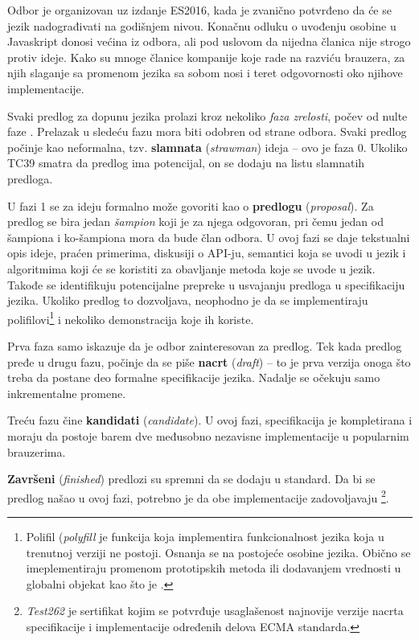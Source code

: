 Odbor je organizovan uz izdanje ES2016, kada je zvanično potvrđeno da će se jezik nadograđivati na godišnjem nivou.
Konačnu odluku o uvođenju osobine u Javaskript donosi većina iz odbora, ali pod uslovom da nijedna članica nije strogo protiv ideje.
Kako su mnoge članice kompanije koje rade na razviću brauzera, za njih slaganje sa promenom jezika sa sobom nosi i teret odgovornosti oko njihove implementacije.

Svaki predlog za dopunu jezika prolazi kroz nekoliko \textit{faza zrelosti}, počev od nulte faze \cite{axel-rauschmayer:tc39}.
Prelazak u sledeću fazu mora biti odobren od strane odbora.
Svaki predlog počinje kao neformalna, tzv. \textbf{slamnata} (\textsl{strawman}) ideja -- ovo je faza 0.
Ukoliko TC39 smatra da predlog ima potencijal, on se dodaju na listu slamnatih predloga.

U fazi 1 se za ideju formalno može govoriti kao o \textbf{predlogu} (\textsl{proposal}). 
Za predlog se bira jedan \textit{šampion} koji je za njega odgovoran, pri čemu jedan od šampiona i ko-šampiona mora da bude član odbora.
U ovoj fazi se daje tekstualni opis ideje, praćen primerima, diskusiji o API-ju, semantici koja se uvodi u jezik i algoritmima koji će se koristiti za obavljanje metoda koje se uvode u jezik.
Takođe se identifikuju potencijalne prepreke u usvajanju predloga u specifikaciju jezika.
Ukoliko predlog to dozvoljava, neophodno je da se implementiraju polifilovi\footnote{Polifil (\textsl{polyfill} je funkcija koja implementira funkcionalnost jezika koja u trenutnoj verziji ne postoji. Osnanja se na postojeće osobine jezika. Obično se imeplementiraju promenom prototipskih metoda ili dodavanjem vrednosti u globalni objekat kao što je .} i nekoliko demonstracija koje ih koriste.

Prva faza samo iskazuje da je odbor zainteresovan za predlog.
Tek kada predlog pređe u drugu fazu, počinje da se piše \textbf{nacrt} (\textsl{draft}) -- to je prva verzija onoga što treba da postane deo formalne specifikacije jezika.
Nadalje se očekuju samo inkrementalne promene.

Treću fazu čine \textbf{kandidati} (\textsl{candidate}).
U ovoj fazi, specifikacija je kompletirana i moraju da postoje barem dve međusobno nezavisne implementacije u popularnim brauzerima.

\textbf{Završeni} (\textsl{finished}) predlozi su spremni da se dodaju u standard.
Da bi se predlog našao u ovoj fazi, potrebno je da obe implementacije zadovoljavaju \footnote{\textsl{Test262} je sertifikat kojim se potvrđuje usaglašenost najnovije verzije nacrta specifikacije i implementacije određenih delova ECMA standarda.}.
